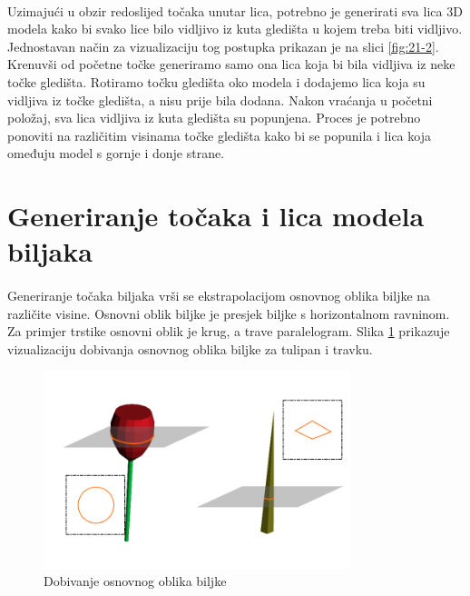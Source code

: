 \documentclass[times, utf8, diplomski]{fer}
\begin{document}
\paragraph{}
Uzimajući u obzir redoslijed točaka unutar lica, potrebno je generirati sva lica 3D modela 
kako bi svako lice bilo vidljivo iz kuta gledišta u kojem treba biti vidljivo. Jednostavan 
način za vizualizaciju tog postupka prikazan je na slici \ref{fig:21-2}. Krenuvši od 
početne točke generiramo samo ona lica koja bi bila vidljiva iz neke točke gledišta. 
Rotiramo točku gledišta oko modela i dodajemo lica koja su vidljiva iz točke gledišta, a 
nisu prije bila dodana. Nakon vraćanja u početni položaj, sva lica vidljiva iz kuta 
gledišta su popunjena. Proces je potrebno ponoviti na različitim visinama točke gledišta 
kako bi se popunila i lica koja omeđuju model s gornje i donje strane.


\section{Generiranje točaka i lica modela biljaka} \label{plant_gen}
\paragraph{}
Generiranje točaka biljaka vrši se ekstrapolacijom osnovnog oblika biljke na različite 
visine. Osnovni oblik biljke je presjek biljke s horizontalnom ravninom. Za primjer 
trstike osnovni oblik je krug, a trave paralelogram. Slika \ref{fig:22-1} prikazuje 
vizualizaciju dobivanja osnovnog oblika biljke za tulipan i travku.

\begin{figure}[h]
	\centering
	\includegraphics[width=0.8\textwidth]{img/22-1}
	\caption{Dobivanje osnovnog oblika biljke}
	\label{fig:22-1}
\end{figure}
\end{document}
